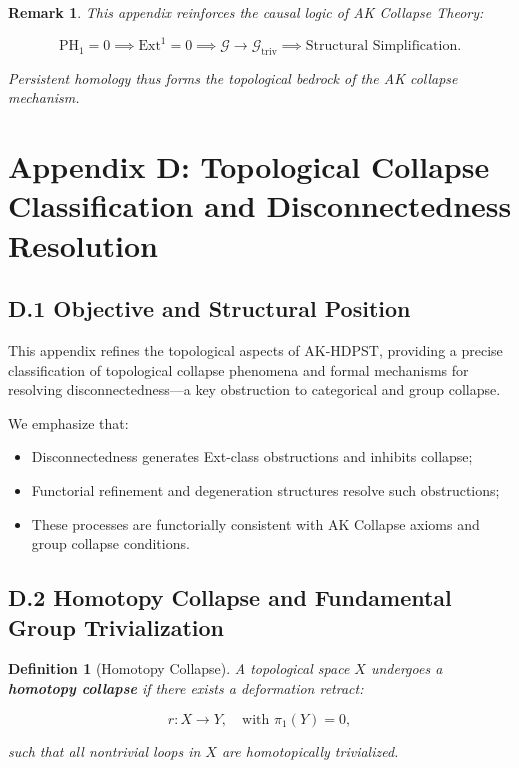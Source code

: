 \documentclass[11pt]{article}
\newtheorem{definition}[theorem]{Definition}
\newtheorem{remark}[theorem]{Remark}
\begin{document}
\begin{remark}
This appendix reinforces the causal logic of AK Collapse Theory:

\[
\mathrm{PH}_1 = 0 \implies \mathrm{Ext}^1 = 0 \implies \mathcal{G} \longrightarrow \mathcal{G}_{\mathrm{triv}} \implies \text{Structural Simplification}.
\]

Persistent homology thus forms the topological bedrock of the AK collapse mechanism.

\end{remark}



\section*{Appendix D: Topological Collapse Classification and Disconnectedness Resolution}

\subsection*{D.1 Objective and Structural Position}

This appendix refines the topological aspects of AK-HDPST, providing a precise classification of topological collapse phenomena and formal mechanisms for resolving disconnectedness—a key obstruction to categorical and group collapse.

We emphasize that:

\begin{itemize}
    \item Disconnectedness generates Ext-class obstructions and inhibits collapse;
    \item Functorial refinement and degeneration structures resolve such obstructions;
    \item These processes are functorially consistent with AK Collapse axioms and group collapse conditions.
\end{itemize}

\subsection*{D.2 Homotopy Collapse and Fundamental Group Trivialization}

\begin{definition}[Homotopy Collapse]
A topological space \( X \) undergoes a \textbf{homotopy collapse} if there exists a deformation retract:

\[
r: X \to Y, \quad \text{with } \pi_1(Y) = 0,
\]

such that all nontrivial loops in \( X \) are homotopically trivialized.
\end{definition}
\end{document}
